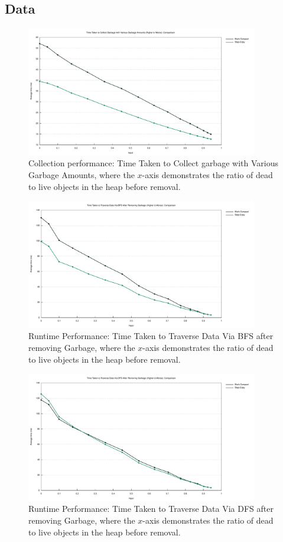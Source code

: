 \documentclass[index]{subfiles}
\begin{document}
\subsection{Data}
\begin{figure}[H]
    \centering
    \includegraphics[width=0.9\textwidth]{pics/collect.pdf}
    \caption{Collection performance: Time Taken to Collect garbage with Various Garbage Amounts, where the \(x\)-axis demonstrates the ratio of dead to live objects in the heap before removal.}
\end{figure}
\begin{figure}[H]
    \centering
    \includegraphics[width=0.9\textwidth]{pics/bfs.pdf}
    \caption{Runtime Performance: Time Taken to Traverse Data Via BFS after removing Garbage, where the \(x\)-axis demonstrates the ratio of dead to live objects in the heap before removal.}
\end{figure}
\begin{figure}[H]
    \centering
    \includegraphics[width=0.9\textwidth]{pics/dfs.pdf}
    \caption{Runtime Performance: Time Taken to Traverse Data Via DFS after removing Garbage, where the \(x\)-axis demonstrates the ratio of dead to live objects in the heap before removal.}
\end{figure}
\end{document}
